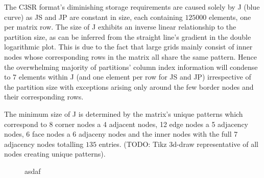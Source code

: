 \documentclass{article}
\begin{document}
    The C3SR format's diminishing storage requirements are caused solely by J (blue curve) as JS and
    JP are constant in size, each containing $125000$ elements, one per matrix row. The size of J
    exhibits an inverse linear relationship to the partition size, as can be inferred from the
    straight line's gradient in the double logarithmic plot. This is due to the fact that large
    grids mainly consist of inner nodes whose corresponding rows in the matrix all share the same pattern. Hence the overwhelming majority of partitions' column index information will condense to 7 elements within J (and one element per row for JS and JP) irrespective of the partition size with exceptions arising only around the few border nodes and their corresponding rows.

    The minimum size of J is determined by the matrix's unique patterns which correspond to 8 corner
    nodes a 4 adjacent nodes, 12 edge nodes a 5 adjacency nodes, 6 face nodes a 6 adjaceny nodes and
    the inner nodes with the full 7 adjacency nodes totalling $135$ entries. (TODO: Tikz 3d-draw
    representative of all nodes creating unique patterns).

    \begin{figure}[!ht]
      \centering
      \par
      \caption{asdaf}
    \end{figure}
\end{document}
